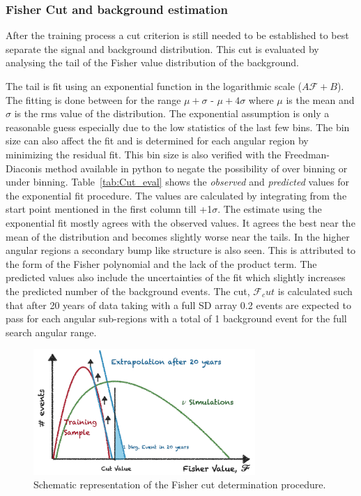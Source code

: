 \subsubsection{Fisher Cut and background estimation}
\label{subsubsec:nu_sel_fisher_cut}
After the training process a cut criterion is still needed to be established to best separate the signal and background distribution. This cut is evaluated by analysing the tail of the Fisher value distribution of the background. 

The tail is fit using an exponential function in the logarithmic scale ($A \mathcal{F} + B$). The fitting is done between for the range $\mu + \sigma$ - $\mu + 4\sigma$ where $\mu$ is the mean and $\sigma$ is the rms value of the distribution. The exponential assumption is only a reasonable guess especially due to the low statistics of the last few bins. The bin size can also affect the fit and is determined for each angular region by minimizing the residual fit. This bin size is also verified with the Freedman-Diaconis method available in python to negate the possibility of over binning or under binning. Table~\ref{tab:Cut_eval} shows the \textit{observed} and \textit{predicted} values for the exponential fit procedure. The values are calculated by integrating from the start point mentioned in the first column till +1$\sigma$. The estimate using the exponential fit mostly agrees with the observed values. It agrees the best near the mean of the distribution and becomes slightly worse near the tails. In the higher angular regions a secondary bump like structure is also seen. This is attributed to the form of the Fisher polynomial and the lack of the product term. The predicted values also include the uncertainties of the fit which slightly increases the predicted number of the background events. The cut, $\mathcal{F}_cut$ is calculated such that after 20 years of data taking with a full SD array 0.2 events are expected to pass for each angular sub-regions with a total of 1 background event for the full search angular range. 

\begin{figure}[t!]
  \centering
  \includegraphics[width=0.75\textwidth]{thesis_figures/Nu_analysis/Fisher_cut_schematic.pdf}
  \caption{Schematic representation of the Fisher cut determination procedure.}
  \label{fig:Fish_cut_schem}
\end{figure}

